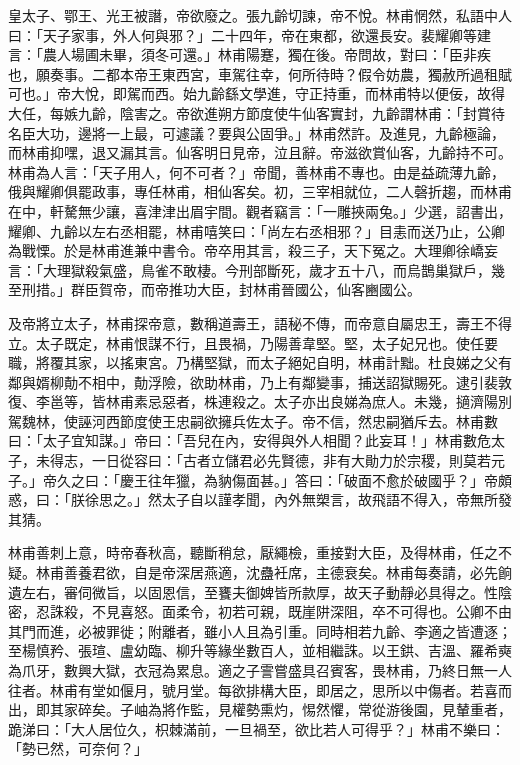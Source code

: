 \begin{pinyinscope}
 皇太子、鄂王、光王被譖，帝欲廢之。張九齡切諫，帝不悅。林甫惘然，私語中人曰：「天子家事，外人何與邪？」二十四年，帝在東都，欲還長安。裴耀卿等建言：「農人場圃未畢，須冬可還。」林甫陽蹇，獨在後。帝問故，對曰：「臣非疾也，願奏事。二都本帝王東西宮，車駕往幸，何所待時？假令妨農，獨赦所過租賦可也。」帝大悅，即駕而西。始九齡繇文學進，守正持重，而林甫特以便佞，故得大任，每嫉九齡，陰害之。帝欲進朔方節度使牛仙客實封，九齡謂林甫：「封賞待名臣大功，邊將一上最，可遽議？要與公固爭。」林甫然許。及進見，九齡極論，而林甫抑嘿，退又漏其言。仙客明日見帝，泣且辭。帝滋欲賞仙客，九齡持不可。林甫為人言：「天子用人，何不可者？」帝聞，善林甫不專也。由是益疏薄九齡，俄與耀卿俱罷政事，專任林甫，相仙客矣。初，三宰相就位，二人磬折趨，而林甫在中，軒驁無少讓，喜津津出眉宇間。觀者竊言：「一雕挾兩兔。」少選，詔書出，耀卿、九齡以左右丞相罷，林甫嘻笑曰：「尚左右丞相邪？」目恚而送乃止，公卿為戰慄。於是林甫進兼中書令。帝卒用其言，殺三子，天下冤之。大理卿徐嶠妄言：「大理獄殺氣盛，鳥雀不敢棲。今刑部斷死，歲才五十八，而烏鵲巢獄戶，幾至刑措。」群臣賀帝，而帝推功大臣，封林甫晉國公，仙客豳國公。



 及帝將立太子，林甫探帝意，數稱道壽王，語秘不傳，而帝意自屬忠王，壽王不得立。太子既定，林甫恨謀不行，且畏禍，乃陽善韋堅。堅，太子妃兄也。使任要職，將覆其家，以搖東宮。乃構堅獄，而太子絕妃自明，林甫計黜。杜良娣之父有鄰與婿柳勣不相中，勣浮險，欲助林甫，乃上有鄰變事，捕送詔獄賜死。逮引裴敦復、李邕等，皆林甫素忌惡者，株連殺之。太子亦出良娣為庶人。未幾，擿濟陽別駕魏林，使誣河西節度使王忠嗣欲擁兵佐太子。帝不信，然忠嗣猶斥去。林甫數曰：「太子宜知謀。」帝曰：「吾兒在內，安得與外人相聞？此妄耳！」林甫數危太子，未得志，一日從容曰：「古者立儲君必先賢德，非有大勛力於宗稷，則莫若元子。」帝久之曰：「慶王往年獵，為豽傷面甚。」答曰：「破面不愈於破國乎？」帝頗惑，曰：「朕徐思之。」然太子自以謹孝聞，內外無槊言，故飛語不得入，帝無所發其猜。



 林甫善刺上意，時帝春秋高，聽斷稍怠，厭繩檢，重接對大臣，及得林甫，任之不疑。林甫善養君欲，自是帝深居燕適，沈蠱衽席，主德衰矣。林甫每奏請，必先餉遺左右，審伺微旨，以固恩信，至饔夫御婢皆所款厚，故天子動靜必具得之。性陰密，忍誅殺，不見喜怒。面柔令，初若可親，既崖阱深阻，卒不可得也。公卿不由其門而進，必被罪徙；附離者，雖小人且為引重。同時相若九齡、李適之皆遭逐；至楊慎矜、張瑄、盧幼臨、柳升等緣坐數百人，並相繼誅。以王鉷、吉溫、羅希奭為爪牙，數興大獄，衣冠為累息。適之子霅嘗盛具召賓客，畏林甫，乃終日無一人往者。林甫有堂如偃月，號月堂。每欲排構大臣，即居之，思所以中傷者。若喜而出，即其家碎矣。子岫為將作監，見權勢熏灼，惕然懼，常從游後園，見輦重者，跪涕曰：「大人居位久，枳棘滿前，一旦禍至，欲比若人可得乎？」林甫不樂曰：「勢已然，可奈何？」




\end{pinyinscope}
